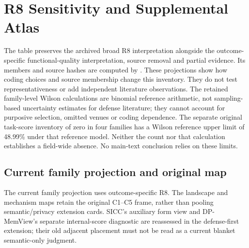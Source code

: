 \section{R8 Sensitivity and Supplemental Atlas}\label{sec:r42-sensitivity}
The table preserves the archived broad R8 interpretation alongside the outcome-specific functional-quality interpretation, source removal and partial evidence. Its members and source hashes are computed by . These projections show how coding choices and source membership change this inventory. They do not test representativeness or add independent literature observations. The retained family-level Wilson calculations are binomial reference arithmetic, not sampling-based uncertainty estimates for defense literature; they cannot account for purposive selection, omitted venues or coding dependence. The separate original task-score inventory of zero in four families has a Wilson reference upper limit of 48.99\% under that reference model. Neither the count nor that calculation establishes a field-wide absence. No main-text conclusion relies on these limits.


\subsection{Current family projection and original map}
The current family projection uses outcome-specific R8. The landscape and mechanism maps retain the original C1--C5 frame, rather than pooling semantic/privacy extension cards. SICC's auxiliary form view and DP-MemView's separate internal-score diagnostic are reassessed in the defense-first extension; their old adjacent placement must not be read as a current blanket semantic-only judgment.






